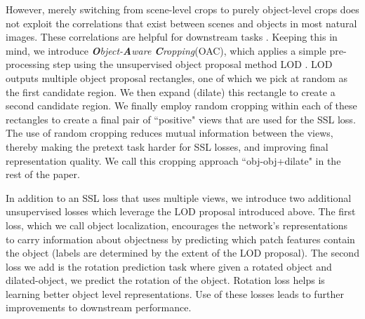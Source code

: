 However, merely switching from scene-level crops to purely object-level crops does not exploit the correlations that exist between scenes and objects in most natural images. These correlations are helpful for downstream tasks \cite{xiao2020noise}. Keeping this in mind, we introduce \textit{\textbf{O}bject-\textbf{A}ware \textbf{C}ropping}(OAC), which applies a simple pre-processing step using the unsupervised object proposal method LOD \cite{Vo2021LargeScaleUO}. LOD outputs multiple object proposal rectangles, one of which we pick at random as the first candidate region. We then expand (dilate) this rectangle to create a second candidate region. We finally employ random cropping within each of these rectangles to create a final pair of ``positive" views that are used for the SSL loss. The use of random cropping reduces mutual information between the views, thereby making the pretext task harder for SSL losses, and improving final representation quality. We call this cropping approach ``obj-obj+dilate" in the rest of the paper. 

In addition to an SSL loss that uses multiple views, we introduce two additional unsupervised losses which leverage the LOD proposal introduced above. The first loss, which we call object localization, encourages the network's representations to carry information about objectness by predicting which patch features contain the object (labels are determined by the extent of the LOD proposal). The second loss we add is the rotation prediction task where given a rotated object and dilated-object, we predict the rotation of the object. Rotation loss helps is learning better object level representations.
Use of these losses leads to further improvements to downstream performance.



